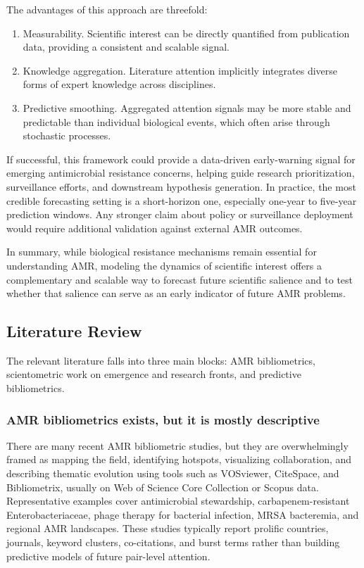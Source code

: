 \documentclass[
]{article}
\providecommand{\tightlist}{%
  \setlength{\itemsep}{0pt}\setlength{\parskip}{0pt}}
\begin{document}
The advantages of this approach are threefold:

\begin{enumerate}
\def\labelenumi{\arabic{enumi}.}
\tightlist
\item
  Measurability. Scientific interest can be directly quantified from
  publication data, providing a consistent and scalable signal.
\item
  Knowledge aggregation. Literature attention implicitly integrates
  diverse forms of expert knowledge across disciplines.
\item
  Predictive smoothing. Aggregated attention signals may be more stable
  and predictable than individual biological events, which often arise
  through stochastic processes.
\end{enumerate}

If successful, this framework could provide a data-driven early-warning
signal for emerging antimicrobial resistance concerns, helping guide
research prioritization, surveillance efforts, and downstream hypothesis
generation. In practice, the most credible forecasting setting is a
short-horizon one, especially one-year to five-year prediction windows.
Any stronger claim about policy or surveillance deployment would require
additional validation against external AMR outcomes.

In summary, while biological resistance mechanisms remain essential for
understanding AMR, modeling the dynamics of scientific interest offers a
complementary and scalable way to forecast future scientific salience
and to test whether that salience can serve as an early indicator of
future AMR problems.

\subsection{Literature Review}\label{literature-review}

The relevant literature falls into three main blocks: AMR bibliometrics,
scientometric work on emergence and research fronts, and predictive
bibliometrics.

\subsubsection{AMR bibliometrics exists, but it is mostly
descriptive}\label{1-amr-bibliometrics-exists-but-it-is-mostly-descriptive}

There are many recent AMR bibliometric studies, but they are
overwhelmingly framed as mapping the field, identifying hotspots,
visualizing collaboration, and describing thematic evolution using tools
such as VOSviewer, CiteSpace, and Bibliometrix, usually on Web of
Science Core Collection or Scopus data. Representative examples cover
antimicrobial stewardship, carbapenem-resistant Enterobacteriaceae,
phage therapy for bacterial infection, MRSA bacteremia, and regional AMR
landscapes. These studies typically report prolific countries, journals,
keyword clusters, co-citations, and burst terms rather than building
predictive models of future pair-level attention.
\end{document}
